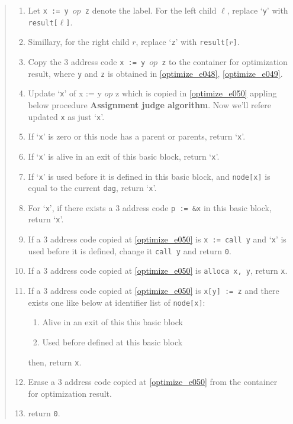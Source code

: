 \begin{quote}
\begin{enumerate}
\item \label{optimize_e048}
      Let {\tt{x := y $op$ z}} denote the label.
      For the left child $\ell$, replace `{\tt{y}}' with
      {\tt{result[$\ell$]}}.
\item \label{optimize_e049}
      Simillary, for the right child $r$, replace `{\tt{z}}'
      with {\tt{result[$r$]}}.
\item \label{optimize_e050}
      Copy the 3 address code {\tt{x := y $op$ z}} to the container
      for optimization result, where {\tt{y}} and {\tt{z}}
      is obtained in \ref{optimize_e048}, \ref{optimize_e049}.
\item Update `{\tt{x}}' of {x := y $op$ z} which is copied in
      \ref{optimize_e050} appling below procedure
      {\bf Assignment judge algorithm}. Now we'll refere updated
       {\tt{x}} as just `{\tt{x}}'.
\item  If `{\tt{x}}' is zero or this node has a parent or parents,
       return `{\tt{x}}'.
\item If `{\tt{x}}' is alive in an exit of this basic block,
      return `{\tt{x}}'.
\item If `{\tt{x}}' is used before it is defined
      in this basic block, and {\tt{node[x]}} is equal to
      the current {\tt{dag}}, return `{\tt{x}}'.
\item For `{\tt{x}}', if there exists a 3 address code {\tt{p := \&x}} in this
      basic block, return `{\tt{x}}'.
\item \label{optimize_e057}
      If a 3 address code copied at \ref{optimize_e050} is
      {\tt{x := call y}} and `{\tt{x}}' is used before it is
      defined, change it {\tt{call y}} and return {\tt{0}}.
\item If a 3 address code copied at \ref{optimize_e050} is
      {\tt{alloca x, y}}, return {\tt{x}}.
\item If a 3 address code copied at \ref{optimize_e050} is
      {\tt{x[y] := z}} and there exists one like below
      at identifier list of {\tt{node[x]}}:
      \begin{enumerate}
      \item Alive in an exit of this this basic block
      \item Used before defined at this basic block
      \end{enumerate}
      then, return {\tt{x}}.
\item \label{optimize_e056}
      Erase a 3 address code copied at \ref{optimize_e050} 
      from the container for optimization result.
\item return {\tt{0}}.
\end{enumerate}
\end{quote}

